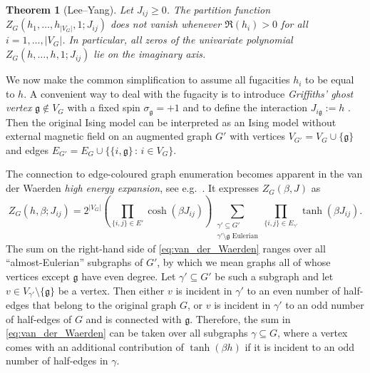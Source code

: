 \documentclass[11pt, a4paper]{article}
\newtheorem{theorem}{Theorem}
\numberwithin{theorem}{section}
\theoremstyle{remark}
\renewcommand{\Re}{\mathfrak{R}}
\newcommand{\g}{\mathfrak{g}}
\theoremstyle{theorem}
\begin{document}
\begin{theorem}[Lee--Yang]
  Let $J_{ij} \geq 0$. The partition function $Z_G(h_1,\dots,h_{|V_G|}, 1; J_{ij})$ does not vanish whenever $\Re(h_i) > 0$ for all $i=1,\dots,|V_G|$. In particular, all zeros of the univariate polynomial $Z_G(h,\dots,h, 1; J_{ij})$ lie on the imaginary axis.
\end{theorem}

We now make the common simplification to assume all fugacities $h_i$ to be equal to $h$. A convenient way to deal with the fugacity is to introduce \emph{Griffiths' ghost vertex} $\g\notin V_G$ with a fixed spin $\sigma_{\g} = +1$ and to define the interaction $J_{i\g} := h$ \cite{griffiths1967correlations}. Then the original Ising model can be interpreted as an Ising model without external magnetic field on an augmented graph $G'$ with vertices $V_{G'} = V_G \cup \{\g\}$ and edges $E_{G'} = E_G \cup \{ \{i,\g \} \,:\, i\in V_G \}$.\par

The connection to edge-coloured graph enumeration becomes apparent in the van der Waerden \emph{high energy expansion}, see e.g.\ \cite[\S 2.2.1]{duminil2016random}.
It expresses $Z_G(\beta, J)$ as 
\begin{equation}
  \label{eq:van_der_Waerden}
  Z_G(h,\beta;J_{ij}) = 2^{|V_G|} \left(\prod_{\{i,j\}\in E'}\cosh(\beta J_{ij})\right) \sum_{\substack{\gamma' \subseteq G' \\ \gamma' \setminus \g \text{ Eulerian}}} \prod_{\{i,j\}\in E_{\gamma'}} \tanh(\beta J_{ij}).
\end{equation}
The sum on the right-hand side of \eqref{eq:van_der_Waerden} ranges over all ``almost-Eulerian'' subgraphs of $G'$, by which we mean graphs all of whose vertices except $\g$ have even degree. 
Let $\gamma'\subseteq G'$ be such a subgraph and let $v\in V_{\gamma'} \setminus \{\g\}$ be a vertex. Then either $v$ is incident in $\gamma'$ to an even number of half-edges that belong to the original graph $G$, or $v$ is incident in $\gamma'$ to an odd number of half-edges of $G$ and is connected with $\g$. 
Therefore, the sum in \eqref{eq:van_der_Waerden} can be taken over all subgraphs $\gamma\subseteq G$, where a vertex comes with an additional contribution of $\tanh(\beta h)$ if it is incident to an odd number of half-edges in $\gamma$. \par
\end{document}
